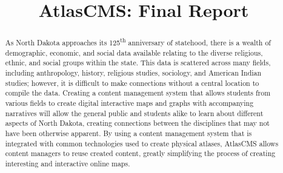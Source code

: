 \documentclass[11pt, final, conference, twocolumn]{IEEEtran}
\begin{document}
\title{AtlasCMS: Final Report}

\author{


\and


\and


\and


}

\maketitle

\begin{abstract}

As North Dakota approaches its 125\textsuperscript{th} anniversary of statehood, there is a wealth of demographic, economic, and social data available relating to the diverse religious, ethnic, and social groups within the state. This data is scattered across many fields, including anthropology, history, religious studies, sociology, and American Indian studies; however, it is difficult to make connections without a central location to compile the data. Creating a content management system that allows students from various fields to create digital interactive maps and graphs with accompanying narratives will allow the general public and students alike to learn about different aspects of North Dakota, creating connections between the disciplines that may not have been otherwise apparent. By using a content management system that is integrated with common technologies used to create physical atlases, AtlasCMS allows content managers to reuse created content, greatly simplifying the process of creating interesting and interactive online maps.

\end{abstract}
\end{document}
